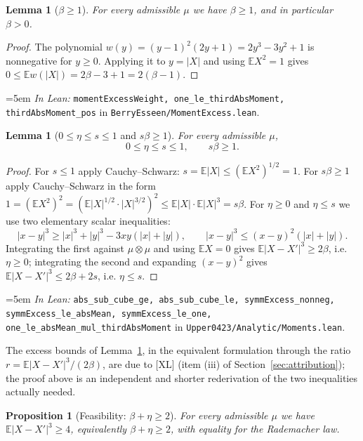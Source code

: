\documentclass[11pt,a4paper]{article}
\newtheorem{proposition}[theorem]{Proposition}
\newtheorem{lemma}[theorem]{Lemma}
\theoremstyle{definition}
\newcommand{\EE}{\mathbb{E}}
\newcommand{\Lean}[1]{\texttt{#1}}
\newcommand{\file}[1]{\texttt{#1}}
\newcommand{\formal}[2]{%
  \par\smallskip
  \begingroup\small\raggedright\emergencystretch=5em
  \noindent\textit{In Lean:} \Lean{#1} in \file{#2}.\par
  \endgroup\smallskip}
\begin{document}
\begin{lemma}[$\beta\ge1$]
  \label{lem:betapos}
  For every admissible $\mu$ we have $\beta\ge1$, and in particular $\beta>0$.
\end{lemma}

\begin{proof}
  The polynomial $w(y)=(y-1)^2(2y+1)=2y^3-3y^2+1$ is nonnegative for $y\ge0$.
  Applying it to $y=|X|$ and using $\EE X^2=1$ gives
  $0\le\EE w(|X|)=2\beta-3+1=2(\beta-1)$.
\end{proof}
\formal{momentExcessWeight, one\_le\_thirdAbsMoment, thirdAbsMoment\_pos}{BerryEsseen/MomentExcess.lean}

\begin{lemma}[$0\le\eta\le s\le1$ and $s\beta\ge1$]
  \label{lem:eta}
  For every admissible $\mu$,
  \[
    0\le\eta\le s\le 1,\qquad s\beta\ge1 .
  \]
\end{lemma}

\begin{proof}
  For $s\le1$ apply Cauchy--Schwarz: $s=\EE|X|\le(\EE X^2)^{1/2}=1$. For
  $s\beta\ge1$ apply Cauchy--Schwarz in the form
  $1=(\EE X^2)^2=(\EE|X|^{1/2}\cdot|X|^{3/2})^2\le\EE|X|\cdot\EE|X|^3=s\beta$.
  For $\eta\ge0$ and $\eta\le s$ we use two elementary scalar inequalities:
  \[
    |x-y|^3\ge|x|^3+|y|^3-3xy(|x|+|y|),
    \qquad
    |x-y|^3\le(x-y)^2(|x|+|y|) .
  \]
  Integrating the first against $\mu\otimes\mu$ and using $\EE X=0$ gives
  $\EE|X-X'|^3\ge2\beta$, i.e. $\eta\ge0$; integrating the second and expanding
  $(x-y)^2$ gives $\EE|X-X'|^3\le2\beta+2s$, i.e. $\eta\le s$.
\end{proof}
\formal{abs\_sub\_cube\_ge, abs\_sub\_cube\_le, symmExcess\_nonneg, symmExcess\_le\_absMean, symmExcess\_le\_one, one\_le\_absMean\_mul\_thirdAbsMoment}{Upper0423/Analytic/Moments.lean}

The excess bounds of Lemma~\ref{lem:eta}, in the equivalent formulation through
the ratio $r=\EE|X-X'|^3/(2\beta)$, are due to [XL] (item (iii) of
Section~\ref{sec:attribution}); the proof above is an independent and shorter
rederivation of the two inequalities actually needed.

\begin{proposition}[Feasibility: $\beta+\eta\ge2$]
  \label{prop:feasible}
  For every admissible $\mu$ we have $\EE|X-X'|^3\ge4$, equivalently
  $\beta+\eta\ge2$, with equality for the Rademacher law.
\end{proposition}
\end{document}
